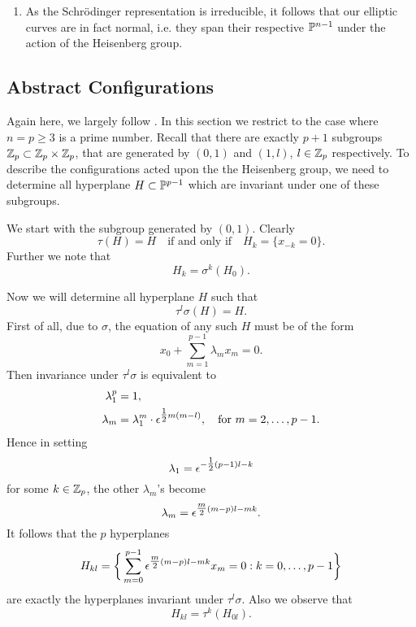 \begin{remark}
\begin{enumerate}
		\item As the Schr{\"o}dinger representation is irreducible, it follows that our elliptic curves are in fact normal, i.e. they span their respective $\mathbb{P}^{n-1}$ under the action of the Heisenberg group.
	\end{enumerate}
\end{remark}

\subsection{Abstract Configurations}
Again here, we largely follow \cite{Hulek_1983}.
In this section we restrict to the case where $n = p \geq 3$ is a prime number.
Recall that there are exactly $p+1$ subgroups $\mathbb{Z}_{p} \subset \mathbb{Z}_{p} \times \mathbb{Z}_{p}$, that are generated by $(0,1)$ and $(1,l)$, $l \in \mathbb{Z}_{p}$ respectively. To describe the configurations acted upon the the Heisenberg group, we need to determine all hyperplane $H \subset \mathbb{P}^{p-1}$ which are invariant under one of these subgroups.

We start with the subgroup generated by $(0,1)$. Clearly
\begin{equation*}
	\tau(H) = H\quad\text{if and only if}\quad H_{k} = \{ x_{-k} = 0\}.
\end{equation*}
Further we note that
\begin{equation*}
	H_{k} = \sigma^{k}(H_{0}).
\end{equation*}

Now we will determine all hyperplane $H$ such that
\begin{equation*}
	\tau^{l}\sigma(H) = H.
\end{equation*}
First of all, due to $\sigma$, the equation of any such $H$ must be of the form
\begin{equation*}
	x_{0} + \sum_{m=1}^{p-1}\lambda_{m}x_{m} = 0.
\end{equation*}
Then invariance under $\tau^{l}\sigma$ is equivalent to
\begin{equation*}
	\begin{split}
	\lambda_{1}^{p} &= 1,\\
	\lambda_{m} &= \lambda_{1}^{m}\cdot \epsilon^{\tfrac{1}{2}m(m-l)},\quad\text{for } m = 2,\ldots, p-1.
	\end{split}
\end{equation*}
Hence in setting
\begin{equation*}
	\lambda_{1} = \epsilon^{-\tfrac{1}{2}(p-1)l - k}
\end{equation*}
for some $k \in \mathbb{Z}_{p}$, the other $\lambda_{m}$'s become
\begin{equation*}
	\lambda_{m} = \epsilon^{\tfrac{m}{2}(m-p)l - mk}.
\end{equation*}
It follows that the $p$ hyperplanes
\begin{equation*}
	H_{kl} = \bigg\{ \sum_{m=0}^{p-1} \epsilon^{\tfrac{m}{2}(m-p)l - mk}x_{m} = 0 : k = 0,\ldots, p-1\bigg\}
\end{equation*}
are exactly the hyperplanes invariant under $\tau^{l}\sigma$. Also we observe that
\begin{equation*}
	H_{kl} = \tau^{k}(H_{0l}).
\end{equation*}


